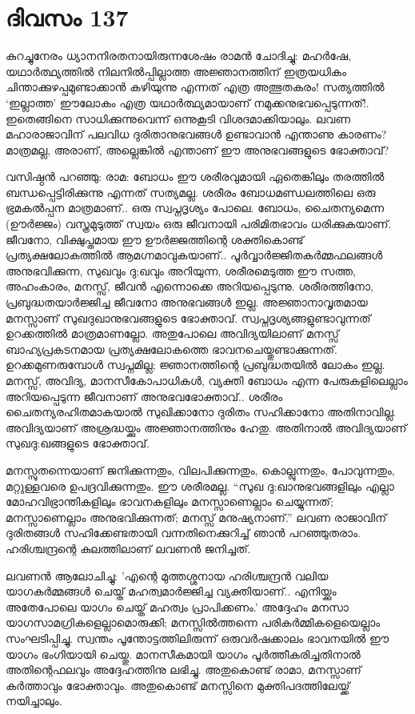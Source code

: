 \newpage
\section{ദിവസം 137}


കുറച്ചുനേരം ധ്യാനനിരതനായിരുന്നശേഷം രാമൻ ചോദിച്ചു: മഹർഷേ, യഥാർത്ഥ്യത്തില്‍ നിലനിൽപ്പില്ലാത്ത അജ്ഞാനത്തിന്‌ ഇത്രയധികം ചിന്താക്കുഴപ്പമുണ്ടാക്കാൻ കഴിയുന്നു എന്നത് എത്ര അത്ഭുതകരം! സത്യത്തിൽ ‘ഇല്ലാത്ത’ ഈലോകം എത്ര യഥാർത്ഥ്യമായാണ്‌ നമുക്കനുഭവപ്പെടുന്നത്‌!. ഇതെങ്ങിനെ സാധിക്കുന്നുവെന്ന് ഒന്നുകൂടി വിശദമാക്കിയാലും. ലവണ മഹാരാജാവിന്‌ പലവിധ ദുരിതാനുഭവങ്ങൾ ഉണ്ടാവാൻ എന്താണു കാരണം? മാത്രമല്ല, അരാണ്‌, അല്ലെങ്കിൽ എന്താണ്‌ ഈ അനുഭവങ്ങളുടെ ഭോക്താവ്?

വസിഷ്ഠൻ പറഞ്ഞു: രാമ: ബോധം ഈ ശരീരവുമായി ഏതെങ്കിലും തരത്തിൽ ബന്ധപ്പെട്ടിരിക്കുന്നു എന്നത് സത്യമല്ല. ശരീരം ബോധമണ്ഡലത്തിലെ ഒരു ഭ്രമകൽപ്പന മാത്രമാണ്‌.. ഒരു സ്വപ്നദൃശ്യം പോലെ. ബോധം, ചൈതന്യമെന്ന (ഊര്‍ജ്ജം) വസ്ത്രമുടുത്ത് സ്വയം ഒരു ജീവനായി പരിമിതഭാവം ധരിക്കുകയാണ്‌. ജീവനോ, വിക്ഷുപ്തമായ  ഈ ഊർജ്ജത്തിന്റെ ശക്തികൊണ്ട് പ്രത്യക്ഷലോകത്തിൽ ആമഗ്നമാവുകയാണ്‌.. പൂർവ്വാർജ്ജിതകർമ്മഫലങ്ങൾ അനുഭവിക്കുന്ന, സുഖവും ദു;ഖവും അറിയുന്ന, ശരീരമെടുത്ത ഈ സത്ത, അഹംകാരം, മനസ്സ്, ജീവൻ എന്നൊക്കെ അറിയപ്പെടുന്നു. ശരീരത്തിനോ, പ്രബുദ്ധതയാർജ്ജിച്ച ജീവനോ അനുഭവങ്ങൾ ഇല്ല. അജ്ഞാനാവൃതമായ മനസ്സാണ്‌ സുഖദുഖാനുഭവങ്ങളുടെ ഭോക്താവ്. സ്വപ്നദൃശ്യങ്ങളുണ്ടാവുന്നത് ഉറക്കത്തിൽ മാത്രമാണല്ലോ. അതുപോലെ അവിദ്യയിലാണ്‌ മനസ്സ് ബാഹ്യപ്രകടനമായ പ്രത്യക്ഷലോകത്തെ ഭാവനചെയ്തുണ്ടാക്കുന്നത്. ഉറക്കമുണരുമ്പോൾ സ്വപ്നമില്ല; ജ്ഞാനത്തിന്റെ പ്രബുദ്ധതയിൽ ലോകം ഇല്ല. മനസ്സ്, അവിദ്യ, മാനസീകോപാധികൾ, വ്യക്തി ബോധം എന്ന പേരുകളിലെല്ലാം അറിയപ്പെടുന്ന ജീവനാണ്‌ അനുഭവഭോക്താവ്‌.. ശരീരം ചൈതന്യരഹിതമാകയാൽ സുഖിക്കാനോ ദുരിതം സഹിക്കാനോ അതിനാവില്ല. അവിദ്യയാണ്‌ അശ്രദ്ധയ്ക്കും അജ്ഞാനത്തിനും ഹേതു. അതിനാൽ അവിദ്യയാണ്‌ സുഖദു:ഖങ്ങളുടെ ഭോക്താവ്.

മനസ്സുതന്നെയാണ്‌ ജനിക്കുന്നതും, വിലപിക്കുന്നതും, കൊല്ലുന്നതും, പോവുന്നതും, മറ്റുള്ളവരെ ഉപദ്രവിക്കുന്നതും. ഈ ശരീരമല്ല. “സുഖ ദു:ഖാനുഭവങ്ങളിലും എല്ലാ മോഹവിഭ്രാന്തികളിലും ഭാവനകളിലും മനസ്സാണെല്ലാം ചെയ്യുന്നത്; മനസ്സാണെല്ലാം അനുഭവിക്കുന്നത്; മനസ്സ് മനുഷ്യനാണ്‌.” ലവണ രാജാവിന്‌ ദുരിതങ്ങൾ സഹിക്കേണ്ടതായി വന്നതിനെക്കുറിച്ച് ഞാൻ പറഞ്ഞുതരാം. ഹരിശ്ചന്ദ്രന്റെ കുലത്തിലാണ്‌ ലവണൻ ജനിച്ചത്.

ലവണൻ ആലോചിച്ചു: 'എന്റെ മുത്തശ്ശനായ ഹരിശ്ചന്ദ്രന്‍ വലിയ യാഗകർമ്മങ്ങള്‍  ചെയ്ത്   മഹത്വമാർജ്ജിച്ച വ്യക്തിയാണ്‌.. എനിയ്ക്കും അതേപോലെ  യാഗം ചെയ്ത് മഹത്വം പ്രാപിക്കണം.' അദ്ദേഹം മനസാ  യാഗസാമഗ്രികളെല്ലാമൊരുക്കി; മനസ്സില്‍ത്തന്നെ പരികർമ്മികളെയെല്ലാം സംഘടിപ്പിച്ചു. സ്വന്തം പൂന്തോട്ടത്തിലിരുന്ന് ഒരുവർഷക്കാലം ഭാവനയിൽ ഈ യാഗം ഭംഗിയായി ചെയ്തു. മാനസീകമായി യാഗം പൂർത്തീകരിച്ചതിനാൽ അതിന്റെഫലവും അദ്ദേഹത്തിനു ലഭിച്ചു. അതുകൊണ്ട് രാമാ, മനസ്സാണ്‌ കർത്താവും ഭോക്താവും. അതുകൊണ്ട് മനസ്സിനെ മുക്തിപദത്തിലേയ്ക്ക് നയിച്ചാലും. 

